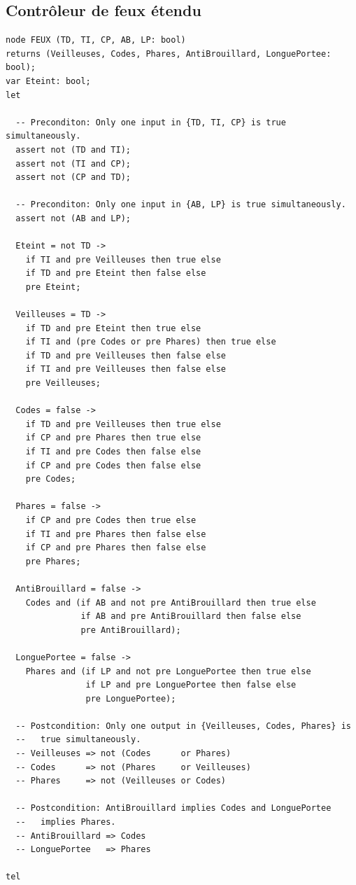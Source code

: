 \documentclass{article}
\begin{document}
    \subsection{Contrôleur de feux étendu}
      \begin{lstlisting}
node FEUX (TD, TI, CP, AB, LP: bool)
returns (Veilleuses, Codes, Phares, AntiBrouillard, LonguePortee: bool);
var Eteint: bool;
let
  
  -- Preconditon: Only one input in {TD, TI, CP} is true simultaneously. 
  assert not (TD and TI);
  assert not (TI and CP);
  assert not (CP and TD);

  -- Preconditon: Only one input in {AB, LP} is true simultaneously. 
  assert not (AB and LP);

  Eteint = not TD ->
    if TI and pre Veilleuses then true else
    if TD and pre Eteint then false else
    pre Eteint;
    
  Veilleuses = TD ->
    if TD and pre Eteint then true else
    if TI and (pre Codes or pre Phares) then true else
    if TD and pre Veilleuses then false else
    if TI and pre Veilleuses then false else
    pre Veilleuses;

  Codes = false ->
    if TD and pre Veilleuses then true else
    if CP and pre Phares then true else
    if TI and pre Codes then false else
    if CP and pre Codes then false else
    pre Codes;

  Phares = false ->
    if CP and pre Codes then true else
    if TI and pre Phares then false else
    if CP and pre Phares then false else
    pre Phares;
 
  AntiBrouillard = false ->
    Codes and (if AB and not pre AntiBrouillard then true else
               if AB and pre AntiBrouillard then false else
               pre AntiBrouillard);

  LonguePortee = false ->
    Phares and (if LP and not pre LonguePortee then true else
                if LP and pre LonguePortee then false else
                pre LonguePortee);

  -- Postcondition: Only one output in {Veilleuses, Codes, Phares} is
  --   true simultaneously.
  -- Veilleuses => not (Codes      or Phares)
  -- Codes      => not (Phares     or Veilleuses)
  -- Phares     => not (Veilleuses or Codes)

  -- Postcondition: AntiBrouillard implies Codes and LonguePortee
  --   implies Phares.
  -- AntiBrouillard => Codes
  -- LonguePortee   => Phares

tel
      \end{lstlisting}
    
\end{document}

